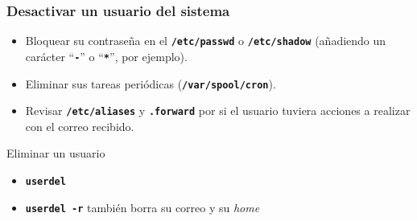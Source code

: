 \documentclass[ucs]{beamer}
\begin{document}

\begin{frame}[fragile]
  \frametitle{Desactivar un usuario del sistema}
  \begin{itemize}
    \item Bloquear su contraseña en el \texttt{\textbf{/etc/passwd}} o \texttt{\textbf{/etc/shadow}}
      (añadiendo un carácter ``\texttt{\textbf{-}}'' o ``\texttt{\textbf{*}}'', por ejemplo).
    \item Eliminar sus tareas periódicas (\texttt{\textbf{/var/spool/cron}}).
    \item Revisar \texttt{\textbf{/etc/aliases}} y \texttt{\textbf{.forward}} por si el usuario tuviera
      acciones a realizar con el correo recibido.
  \end{itemize}
  
Eliminar un usuario           
  \begin{itemize}
    \item \texttt{\textbf{userdel}} 
    \item \texttt{\textbf{userdel -r}}   también borra su correo y su \emph{home}
  \end{itemize}
\end{frame}
\end{document}
